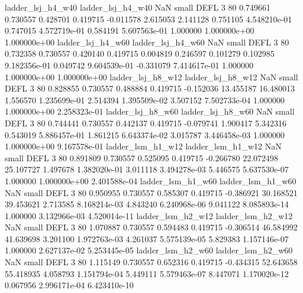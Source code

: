        ladder_lsj_h4_w40        ladder_lsj_h4_w40                   NaN      small     DEFL                 3 80 0.749661       0.730557 0.428701       0.419715   -0.011578      2.615053      2.141128     0.751105   4.548210e-01  0.747015 4.572719e-01     0.584191   5.607563e-01            1.000000    1.000000e+00        1.000000e+00
       ladder_lsj_h4_w60        ladder_lsj_h4_w60                   NaN      small     DEFL                 3 80 0.732358       0.730557 0.420140       0.419715    0.004819      0.246597      0.101279     0.102985   9.182356e-01  0.049742 9.604539e-01    -0.331079   7.414617e-01            1.000000    1.000000e+00        1.000000e+00
       ladder_lsj_h8_w12        ladder_lsj_h8_w12                   NaN      small     DEFL                 3 80 0.828855       0.730557 0.488884       0.419715   -0.152036     13.455187     16.480013     1.556570   1.235699e-01  2.514394 1.395509e-02     3.507152   7.502733e-04            1.000000    1.000000e+00        2.258323e-01
       ladder_lsj_h8_w60        ladder_lsj_h8_w60                   NaN      small     DEFL                 3 80 0.744441       0.730557 0.442137       0.419715   -0.079741      1.900417      5.342316     0.543019   5.886457e-01  1.861215 6.643374e-02     3.015787   3.446458e-03            1.000000    1.000000e+00        9.167578e-01
       ladder_lsm_h1_w12        ladder_lsm_h1_w12                   NaN      small     DEFL                 3 80 0.891809       0.730557 0.525095       0.419715   -0.266780     22.072498     25.107727     1.497678   1.382020e-01  3.011118 3.494278e-03     5.446575   5.637530e-07            1.000000    1.000000e+00        2.401588e-04
       ladder_lsm_h1_w60        ladder_lsm_h1_w60                   NaN      small     DEFL                 3 80 0.950955       0.730557 0.585307       0.419715   -0.386921     30.168521     39.453621     2.713585   8.168214e-03  4.843240 6.240968e-06     9.041122   8.085893e-14            1.000000    3.132966e-03        4.520014e-11
       ladder_lsm_h2_w12        ladder_lsm_h2_w12                   NaN      small     DEFL                 3 80 1.070887       0.730557 0.594483       0.419715   -0.306514     46.584992     41.639698     3.201100   1.972763e-03  4.261037 5.575139e-05     5.829383   1.157146e-07            1.000000    2.627137e-02        5.253445e-05
       ladder_lsm_h2_w60        ladder_lsm_h2_w60                   NaN      small     DEFL                 3 80 1.115149       0.730557 0.652316       0.419715   -0.434315     52.643658     55.418935     4.058793   1.151794e-04  5.449111 5.579463e-07     8.447071   1.170020e-12            0.067956    2.996171e-04        6.423410e-10
